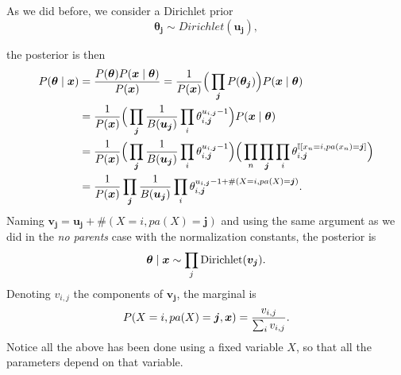 As we did before, we consider a Dirichlet prior
\[
  \bm{\theta_{j}} \sim Dirichlet(\bm{u_{j}}),
\]

the posterior is then
\[
  \begin{aligned}
    P(\bm{\theta} \mid \bm{x}) &= \frac{P(\bm{\theta})P(\bm{x} \mid \bm{\theta}) }{P(\bm{x})} = \frac{1}{P(\bm{x})}\Big(\prod_{\bm{j}}P(\bm{\theta_{j}}) \Big)P(\bm{x} \mid \bm{\theta}) \\
    &= \frac{1}{P(\bm{x})}\Big(\prod_{\bm{j}}\frac{1}{B(\bm{u_{j}})}\prod_{i}\theta_{i,\bm{j}}^{u_{i,\bm{j}}-1}\Big) P(\bm{x} \mid \bm{\theta})\\
    &= \frac{1}{P(\bm{x})}\Big(\prod_{\bm{j}}\frac{1}{B(\bm{u_{j}})}\prod_{i}\theta_{i,\bm{j}}^{u_{i,\bm{j}}-1}\Big) \Big(\prod_{n}\prod_{\bm{j}}\prod_{i} \theta_{i,\bm{j}}^{\mathbb{I}[x_{n} = i, pa(x_{n}) = \bm{j}]}\Big)\\
    &= \frac{1}{P(\bm{x})}\prod_{\bm{j}}\frac{1}{B(\bm{u_{j}})}\prod_{i}\theta_{i,\bm{j}}^{u_{i,\bm{j}}-1 + \#(X = i,pa(X)=\bm{j})}.
  \end{aligned}
\]
Naming \(\bm{v_{j}} = \bm{u_{j}} + \#(X = i, pa(X) = \bm{j})\) and using the same argument as we did in the \emph{no parents} case with the normalization constants, the posterior is
\[
  \bm{\theta} \mid \bm{x} \sim \prod_{j}\text{Dirichlet}(\bm{v_{j}}).
\]
Denoting \(v_{i,j}\) the components of \(\bm{v_{j}}\), the marginal is
\[
  P(X=i, pa(X) = \bm{j}, \bm{x}) = \frac{v_{i,j}}{\sum_{i}v_{i,j}}.
\]
Notice all the above has been done using a fixed variable \(X\), so that all the parameters depend on that variable.
